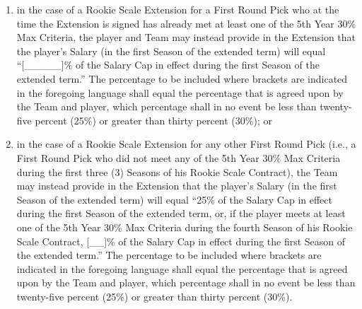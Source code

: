 \documentclass[
]{book}
\providecommand{\tightlist}{%
  \setlength{\itemsep}{0pt}\setlength{\parskip}{0pt}}
\begin{document}
\begin{enumerate}
  \begin{enumerate}
  \def\labelenumii{(\roman{enumii})}
  \tightlist
  \item
    in the case of a Rookie Scale Extension for a First Round Pick who at the time the Extension is signed has already met at least one of the 5th Year 30\% Max Criteria, the player and Team may instead provide in the Extension that the player's Salary (in the first Season of the extended term) will equal ``{[}\_\_\_\_\_{]}\% of the Salary Cap in effect during the first Season of the extended term.'' The percentage to be included where brackets are indicated in the foregoing language shall equal the percentage that is agreed upon by the Team and player, which percentage shall in no event be less than twenty-five percent (25\%) or greater than thirty percent (30\%); or
  \item
    in the case of a Rookie Scale Extension for any other First Round Pick (i.e., a First Round Pick who did not meet any of the 5th Year 30\% Max Criteria during the first three (3) Seasons of his Rookie Scale Contract), the Team may instead provide in the Extension that the player's Salary (in the first Season of the extended term) will equal ``25\% of the Salary Cap in effect during the first Season of the extended term, or, if the player meets at least one of the 5th Year 30\% Max Criteria during the fourth Season of his Rookie Scale Contract, {[}\_\_{]}\% of the Salary Cap in effect during the first Season of the extended term.'' The percentage to be included where brackets are indicated in the foregoing language shall equal the percentage that is agreed upon by the Team and player, which percentage shall in no event be less than twenty-five percent (25\%) or greater than thirty percent (30\%).
  \end{enumerate}


\end{enumerate}
\end{document}
